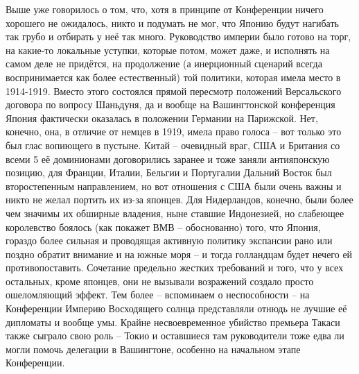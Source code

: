 Выше уже говорилось о том, что, хотя в принципе от Конференции ничего хорошего не ожидалось, никто и подумать не мог, что Японию будут нагибать так грубо и отбирать у неё так много. Руководство империи было готово на торг, на какие-то локальные уступки, которые потом, может даже, и исполнять на самом деле не придётся, на продолжение (а инерционный сценарий всегда воспринимается как более естественный) той политики, которая имела место в 1914-1919. Вместо этого состоялся прямой пересмотр положений Версальского договора по вопросу Шаньдуня, да и вообще на Вашингтонской конференция Япония фактически оказалась в положении Германии на Парижской. Нет, конечно, она, в отличие от немцев в 1919, имела право голоса – вот только это был глас вопиющего в пустыне. Китай – очевидный враг, США и Британия со всеми 5 её доминионами договорились заранее и тоже заняли антияпонскую позицию, для Франции, Италии, Бельгии и Португалии Дальний Восток был второстепенным направлением, но вот отношения с США были очень важны и никто не желал портить их из-за японцев. Для Нидерландов, конечно, были более чем значимы их обширные владения, ныне ставшие Индонезией, но слабеющее королевство боялось (как покажет ВМВ – обоснованно) того, что Япония, гораздо более сильная и проводящая активную политику экспансии рано или поздно обратит внимание и на южные моря – и тогда голландцам будет нечего ей противопоставить. Сочетание предельно жестких требований и того, что у всех остальных, кроме японцев, они не вызывали возражений создало просто ошеломляющий эффект. Тем более – вспоминаем о неспособности – на Конференции Империю Восходящего солнца представляли отнюдь не лучшие её дипломаты и вообще умы. Крайне несвоевременное убийство премьера Такаси также сыграло свою роль – Токио и оставшиеся там руководители тоже едва ли могли помочь делегации в Вашингтоне, особенно на начальном этапе Конференции.

